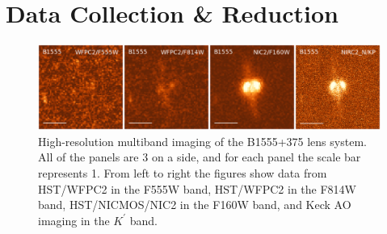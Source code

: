 \documentclass[usenatbib]{mn2e}
\begin{document}

\section{Data Collection \& Reduction}

\begin{figure}
\begin{minipage}{140mm}
\includegraphics[width=140mm]{B1555_gallery.eps}
\caption{High-resolution multiband imaging of the B1555+375 lens system.
All of the panels are 3 on a side, and for each panel the scale bar 
represents 1\arcsec.  From left to right the figures show data from
HST/WFPC2 in the F555W band, HST/WFPC2 in the F814W band, HST/NICMOS/NIC2
in the F160W band, and Keck AO imaging in the $K^\prime$ band.}
%
\end{minipage}

\end{figure}
\end{document}
